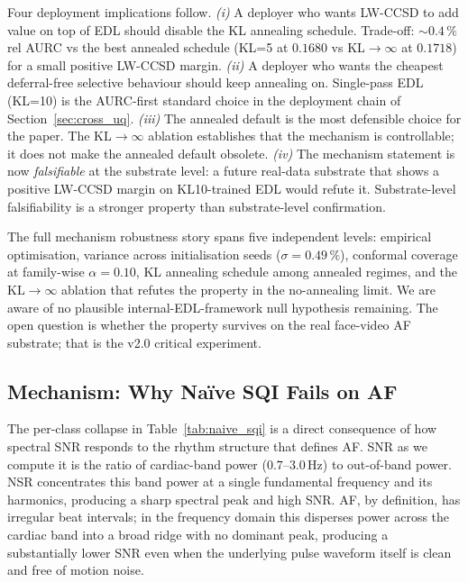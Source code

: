 \documentclass[journal]{IEEEtran}
\begin{document}
Four deployment implications follow.
\emph{(i)} A deployer who wants LW-CCSD to add value on top of EDL should disable the KL annealing schedule. Trade-off: $\sim 0.4\,\%$ rel AURC vs the best annealed schedule (KL=5 at $0.1680$ vs KL$\to\infty$ at $0.1718$) for a small positive LW-CCSD margin.
\emph{(ii)} A deployer who wants the cheapest deferral-free selective behaviour should keep annealing on. Single-pass EDL (KL=10) is the AURC-first standard choice in the deployment chain of Section~\ref{sec:cross_uq}.
\emph{(iii)} The annealed default is the most defensible choice for the paper. The KL$\to\infty$ ablation establishes that the mechanism is controllable; it does not make the annealed default obsolete.
\emph{(iv)} The mechanism statement is now \emph{falsifiable} at the substrate level: a future real-data substrate that shows a positive LW-CCSD margin on KL10-trained EDL would refute it. Substrate-level falsifiability is a stronger property than substrate-level confirmation.

The full mechanism robustness story spans five independent levels: empirical optimisation, variance across initialisation seeds ($\sigma = 0.49\,\%$), conformal coverage at family-wise $\alpha = 0.10$, KL annealing schedule among annealed regimes, and the KL$\to\infty$ ablation that refutes the property in the no-annealing limit. We are aware of no plausible internal-EDL-framework null hypothesis remaining. The open question is whether the property survives on the real face-video AF substrate; that is the v2.0 critical experiment.

\subsection{Mechanism: Why Na\"{i}ve SQI Fails on AF}
\label{sec:mechanism}
The per-class collapse in Table~\ref{tab:naive_sqi} is a direct consequence of how spectral SNR responds to the rhythm structure that defines AF. SNR as we compute it is the ratio of cardiac-band power ($0.7$--$3.0$\,Hz) to out-of-band power. NSR concentrates this band power at a single fundamental frequency and its harmonics, producing a sharp spectral peak and high SNR. AF, by definition, has irregular beat intervals; in the frequency domain this disperses power across the cardiac band into a broad ridge with no dominant peak, producing a substantially lower SNR even when the underlying pulse waveform itself is clean and free of motion noise.
\end{document}
